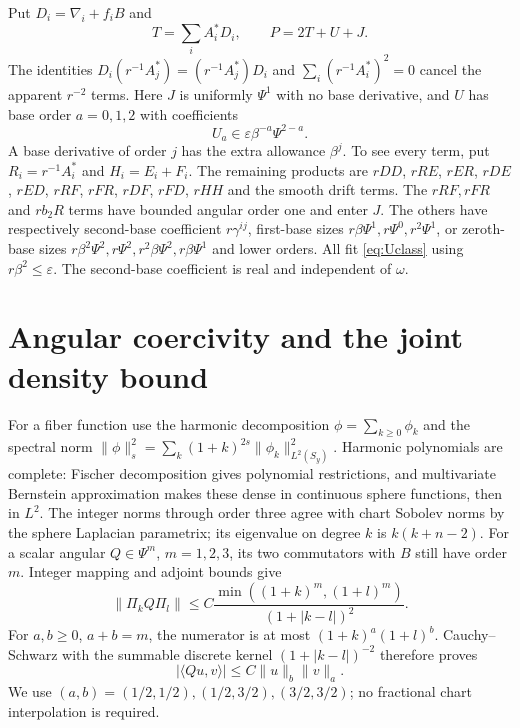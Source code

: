 \documentclass[11pt]{article}
\theoremstyle{definition}\newtheorem{definition}[theorem]{Definition}
\theoremstyle{remark}\newtheorem{remark}[theorem]{Remark}
\newcommand{\ip}[2]{\langle #1,#2\rangle}
\newcommand{\norm}[1]{\lVert #1\rVert}
\begin{document}
Put $D_i=\nabla_i+f_iB$ and
\begin{equation}\label{eq:T}
 T=\sum_iA_i^*D_i,\qquad P=2T+U+J.
\end{equation}
The identities $D_i(r^{-1}A_j^*)=(r^{-1}A_j^*)D_i$ and
$\sum_i(r^{-1}A_i^*)^2=0$ cancel the apparent $r^{-2}$ terms.
Here $J$ is uniformly $\Psi^1$ with no base derivative, and $U$ has
base order $a=0,1,2$ with coefficients
\begin{equation}\label{eq:Uclass}
 U_a\in\varepsilon\beta^{-a}\Psi^{2-a}.
\end{equation}
A base derivative of order $j$ has the extra allowance $\beta^j$.
To see every term, put $R_i=r^{-1}A_i^*$ and $H_i=E_i+F_i$.
The remaining products are $rDD$, $rRE$, $rER$, $rDE$, $rED$,
$rRF$, $rFR$, $rDF$, $rFD$, $rHH$ and the smooth drift terms.
The $rRF,rFR$ and $rb_2R$ terms have bounded angular order one and enter
$J$. The others have respectively second-base coefficient $r\gamma^{ij}$,
first-base sizes $r\beta\Psi^1,r\Psi^0,r^2\Psi^1$, or zeroth-base sizes
$r\beta^2\Psi^2,r\Psi^2,r^2\beta\Psi^2,r\beta\Psi^1$ and lower orders.
All fit \eqref{eq:Uclass} using $r\beta^2\le\varepsilon$.
The second-base coefficient is real and independent of $\omega$.

\section{Angular coercivity and the joint density bound}\label{sec:coercivity}

For a fiber function use the harmonic decomposition
$\phi=\sum_{k\ge0}\phi_k$ and the spectral norm
$\norm{\phi}_s^2=\sum_k(1+k)^{2s}\norm{\phi_k}_{L^2(S_y)}^2$.
Harmonic polynomials are complete: Fischer decomposition gives polynomial
restrictions, and multivariate Bernstein approximation makes these dense
in continuous sphere functions, then in $L^2$. The integer norms through
order three agree with chart Sobolev norms by the sphere Laplacian
parametrix; its eigenvalue on degree $k$ is $k(k+n-2)$.
For a scalar angular $Q\in\Psi^m$, $m=1,2,3$, its two commutators with $B$
still have order $m$. Integer mapping and adjoint bounds give
\[
 \norm{\Pi_kQ\Pi_l}\le
 C\frac{\min((1+k)^m,(1+l)^m)}{(1+|k-l|)^2}.
\]
For $a,b\ge0$, $a+b=m$, the numerator is at most
$(1+k)^a(1+l)^b$. Cauchy--Schwarz with the summable discrete kernel
$(1+|k-l|)^{-2}$ therefore proves
\begin{equation}\label{eq:forms}
 |\ip{Qu}{v}|\le C\norm{u}_b\norm{v}_a.
\end{equation}
We use $(a,b)=(1/2,1/2),(1/2,3/2),(3/2,3/2)$; no fractional chart
interpolation is required.
\end{document}
